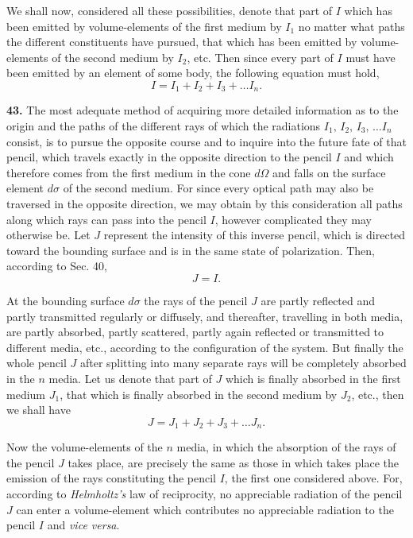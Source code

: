 \documentclass[12pt,oneside]{book}
\begin{document}
We shall now, considered all these possibilities, denote that part of $I$ which has been emitted by volume-elements of the first medium by $I_1$ no matter what paths the different constituents have pursued, that which has been emitted by volume-elements of the second medium by $I_2$, etc. Then since every part of $I$ must have been emitted by an element of some body, the following equation must hold, 
\begin{equation}
    \label{eq44}
    I=I_1+I_2+I_3+\dots I_n.
\end{equation} \par 

\textbf{43.} The most adequate method of acquiring more detailed information as to the origin and the paths of the different rays of which the radiations $I_1,\, I_2,\, I_3,\,\dots I_n$ consist, is to pursue the opposite course and to inquire into the future fate of that pencil, which travels exactly in the opposite direction to the pencil $I$ and which therefore comes from the first medium in the cone $d\Omega$ and falls on the surface element $d\sigma$ of the second medium. For since every optical path may also be traversed in the opposite direction, we may obtain by this consideration all paths along which rays can pass into the pencil $I$, however complicated they may otherwise be. Let $J$ represent the intensity of this inverse pencil, which is directed toward the bounding surface and is in the same state of polarization. Then, according to Sec. 40, 
\begin{equation}
    \label{eq45}
    J=I.
\end{equation} \par 

At the bounding surface $d\sigma$ the rays of the pencil $J$ are partly reflected and partly transmitted regularly or diffusely, and thereafter, travelling in both media, are partly absorbed, partly scattered, partly again reflected or transmitted to different media, etc., according to the configuration of the system. But finally the whole pencil $J$ after splitting into many separate rays will be completely absorbed in the $n$ media. Let us denote that part of $J$ which is finally absorbed in
the first medium $J_1$, that which is finally absorbed in the second medium by $J_2$, etc., then we shall have
\begin{equation}
  J=J_1+J_2+J_3+\dots J_n.
\end{equation} \par

Now the volume-elements of the $n$ media, in which the absorption of the rays of the pencil $J$ takes place, are precisely the same as those in which takes place the emission of the rays constituting the pencil $I$, the first one considered above. For, according to \textit{Helmholtz's} law of reciprocity, no appreciable radiation of the pencil $J$ can enter a volume-element which contributes no appreciable radiation to the pencil $I$ and \textit{vice versa}. \par
\end{document}
